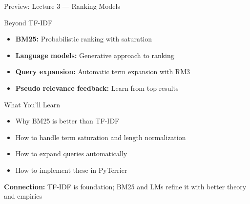 \documentclass[aspectratio=169]{beamer}
\newif\ifanimated
\newcommand{\cpause}{\ifanimated\pause\fi}
\begin{document}
\begin{frame}[shrink=5]{Preview: Lecture 3 — Ranking Models}
\begin{block}{Beyond TF-IDF}
\begin{itemize}
    \item \textbf{BM25:} Probabilistic ranking with saturation
    \item \textbf{Language models:} Generative approach to ranking
    \item \textbf{Query expansion:} Automatic term expansion with RM3
    \item \textbf{Pseudo relevance feedback:} Learn from top results
\end{itemize}
\cpause
\end{block}
\cpause
\vspace{1em}

\begin{exampleblock}{What You'll Learn}
\begin{itemize}
    \item Why BM25 is better than TF-IDF
    \item How to handle term saturation and length normalization
    \item How to expand queries automatically
    \item How to implement these in PyTerrier
\end{itemize}
\cpause
\end{exampleblock}
\cpause
\vspace{1em}

\textbf{Connection:} TF-IDF is foundation; BM25 and LMs refine it with better theory and empirics
\end{frame}
\end{document}
